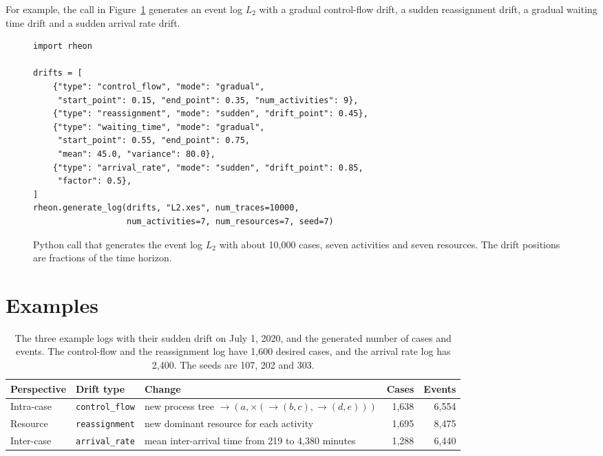 For example, the call in Figure~\ref{fig:rheon:api_example} generates an event log $L_2$ with a gradual control-flow drift, a sudden reassignment drift, a gradual waiting time drift and a sudden arrival rate drift.

\begin{figure}[tbp]
\begin{verbatim}
import rheon

drifts = [
    {"type": "control_flow", "mode": "gradual",
     "start_point": 0.15, "end_point": 0.35, "num_activities": 9},
    {"type": "reassignment", "mode": "sudden", "drift_point": 0.45},
    {"type": "waiting_time", "mode": "gradual",
     "start_point": 0.55, "end_point": 0.75,
     "mean": 45.0, "variance": 80.0},
    {"type": "arrival_rate", "mode": "sudden", "drift_point": 0.85,
     "factor": 0.5},
]
rheon.generate_log(drifts, "L2.xes", num_traces=10000,
                   num_activities=7, num_resources=7, seed=7)
\end{verbatim}
	\caption[Python call that generates the event log $L_2$]{%
		Python call that generates the event log $L_2$ with about 10,000 cases, seven activities and seven resources. The drift positions are fractions of the time horizon.}
	\label{fig:rheon:api_example}
\end{figure}


\section{Examples}
\label{sec:rheon:examples}
\begin{table}[tbp]
	\centering
	\caption[Example logs per perspective]{%
		The three example logs with their sudden drift on July 1, 2020, and the generated number of cases and events. The control-flow and the reassignment log have 1,600 desired cases, and the arrival rate log has 2,400. The seeds are 107, 202 and 303.}
	\label{tab:rheon:scenarios}
	\small
	\begin{tabular}{@{}ll>{\raggedright\arraybackslash}p{5.4cm}rr@{}}
		\toprule
		Perspective & Drift type             & Change                                                                                                           & Cases & Events \\
		\midrule
		Intra-case  & \texttt{control\_flow} & new process tree ${\rightarrow}(a, {\times}({\rightarrow}(b, c), {\rightarrow}(d, e)))$                           & 1,638 & 6,554  \\
		Resource    & \texttt{reassignment}  & new dominant resource for each activity                                                                          & 1,695 & 8,475  \\
		Inter-case  & \texttt{arrival\_rate} & mean inter-arrival time from 219 to 4,380 minutes                                                                & 1,288 & 6,440  \\
		\bottomrule
	\end{tabular}
\end{table}

